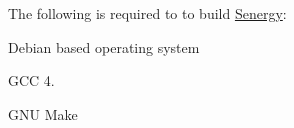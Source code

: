 The following is required to to build \hyperlink{namespace_senergy}{Senergy}\-:


\begin{DoxyItemize}
\item Debian based operating system
\item G\-C\-C 4.
\item G\-N\-U Make 
\end{DoxyItemize}